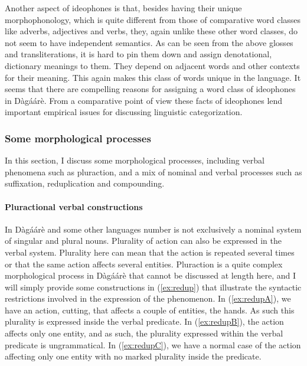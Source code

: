 Another aspect of ideophones is that, besides having their unique morphophonology, which is
quite different from those of comparative word classes like adverbs, adjectives and verbs, they, again unlike these other word classes, do not seem to have independent semantics.
As can be seen from the above glosses and transliterations, it is hard to pin them down and
assign denotational, dictionary meanings to them. They depend on adjacent words and other
contexts for their meaning. This again makes this class of words unique in the language. It
seems that there are compelling reasons for assigning a word class of ideophones in
Dàgáárè. From a comparative point of view these facts of ideophones lend important
empirical issues for discussing linguistic categorization.

\subsubsection{Some morphological processes}
In this section, I discuss some morphological processes, including verbal phenomena
such as pluraction, and a mix of nominal and verbal processes such as suffixation,
reduplication and compounding.

\paragraph{Pluractional verbal constructions}
In Dàgáárè and some other languages number is not exclusively a nominal system of
singular and plural nouns. Plurality of action can also be expressed in the verbal system.
Plurality here can mean that the action is repeated several times or that the same action affects
several entities. Pluraction is a quite complex morphological process in Dàgáárè that cannot
be discussed at length here, and I will simply provide some constructions in (\ref{ex:redup}) that illustrate
the syntactic restrictions involved in the expression of the phenomenon.
In (\ref{ex:redupA}), we have an action, cutting, that affects a couple of entities, the hands. As
such this plurality is expressed inside the verbal predicate. In (\ref{ex:redupB}), the action affects only
one entity, and as such, the plurality expressed within the verbal predicate is ungrammatical.
In (\ref{ex:redupC}), we have a normal case of the action affecting only one entity with no marked
plurality inside the predicate.

